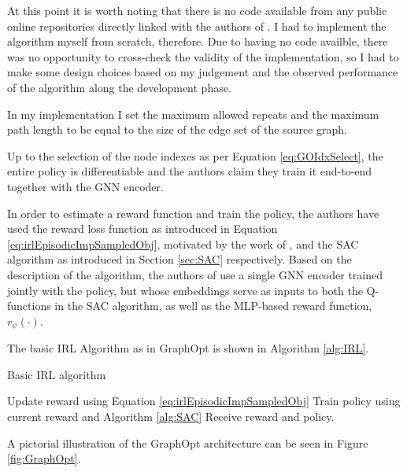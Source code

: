 \documentclass{report}
\numberwithin{equation}{section}
\numberwithin{figure}{section}
\numberwithin{table}{section}
\numberwithin{algorithm}{section}
\begin{document}
At this point it is worth noting that there is no 
code available from any public online repositories directly linked 
with the authors of \cite{GraphOpt}. I had to implement 
the algorithm myself from scratch, therefore. 
Due to having no code availble, there was no opportunity to 
cross-check the validity of the implementation, so I had to make 
some design choices based on my judgement and the observed 
performance of the algorithm along the development phase.

In my implementation I set the maximum allowed repeats 
and the maximum path length to be 
equal to the size of the edge set of the source graph. 

Up to the selection of the node 
indexes as per Equation \ref{eq:GOIdxSelect}, the entire policy 
is differentiable and the authors claim they train it end-to-end 
together with the GNN encoder.

In order to estimate a reward function and train the policy, 
the authors have used the reward loss function as introduced in 
Equation \ref{eq:irlEpisodicImpSampledObj}, motivated by the 
work of \cite{FinnGCL}, and the SAC algorithm \citep{SAC2} 
as introduced in Section \ref{sec:SAC} respectively. Based on 
the description of the algorithm, the authors of \cite{GraphOpt} 
use a single GNN encoder trained jointly with the policy, but 
whose embeddings serve as inputs to both the Q-functions in the 
SAC algorithm, as well as the MLP-based reward function, $r_\psi(\cdot)$.

The basic IRL Algorithm as in GraphOpt is shown in Algorithm \ref{alg:IRL}.

\begin{algorithm}
  \caption{Basic IRL algorithm}
  \label{alg:IRL}
  \begin{algorithmic}
      \State Update reward using Equation \ref{eq:irlEpisodicImpSampledObj}
      \State Train policy using current reward and Algorithm \ref{alg:SAC}
    \EndFor
    \State Receive reward and policy.
  \end{algorithmic}
\end{algorithm}

A pictorial illustration of the GraphOpt architecture can 
be seen in Figure \ref{fig:GraphOpt}.
\end{document}
